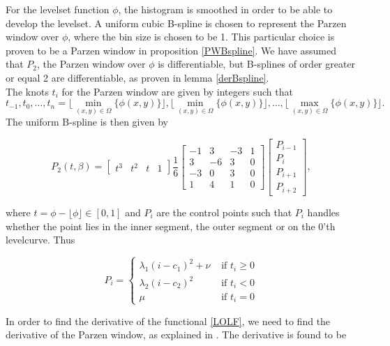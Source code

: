 For the levelset function $\phi$, the histogram is smoothed in order to be able to develop the levelset. A uniform cubic B-spline is chosen to represent the Parzen window over $\phi$, where the bin size is chosen to be 1. This particular choice is proven to be a Parzen window in proposition \ref{PWBspline}. We have assumed that $P_2$, the Parzen window over $\phi$ is differentiable, but B-splines of order greater or equal 2 are differentiable, as proven in lemma \ref{derBspline}. \\
The knots $t_i$ for the Parzen window are given by integers such that
\[
t_{-1},t_0,\dots,t_n = \lfloor\min_{(x,y)\in\Omega}\{\phi(x,y)\}\rfloor, \lfloor\min_{(x,y)\in\Omega}\{\phi(x,y)\}\rfloor, \dots, \lfloor\max_{(x,y)\in\Omega}\{\phi(x,y)\}\rfloor.
\]
The uniform B-spline is then given by

\begin{equation}
  P_2(t,\beta) = 
  \begin{bmatrix} t^3 & t^2 & t & 1 \end{bmatrix} 
  \frac{1}{6} 
  \begin{bmatrix}
    -1 &  3 & -3 & 1 \\
    3 & -6 &  3 & 0 \\
    -3 &  0 &  3 & 0 \\
    1 &  4 &  1 & 0 
  \end{bmatrix}
  \left[\begin{array}{l} 
      P_{i-1} \\
      P_{i} \\
      P_{i+1} \\
      P_{i+2}
    \end{array}\right],
\end{equation}

where $t = \phi-\lfloor \phi\rfloor \in [0,1]$ and $P_i$ are the control points such that $P_i$ handles whether the point lies in the inner segment, the outer segment or on the 0'th levelcurve. Thus

\begin{equation}
  P_i = 
  \begin{cases}
    \lambda_1(i-c_1)^2 + \nu & \mbox{ if } t_i \geq 0\\
    \lambda_2(i-c_2)^2 & \mbox{ if } t_i < 0\\
    \mu & \mbox{ if } t_i = 0
  \end{cases}
\end{equation}

In order to find the derivative of the functional \eqref{LOLF}, we need to find the derivative of the Parzen window, as explained in . The derivative is found to be

